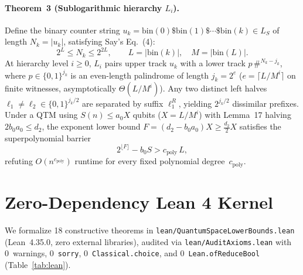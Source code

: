 \documentclass[11pt,twocolumn]{article}
\begin{document}
\paragraph{Theorem~3 (Sublogarithmic hierarchy $L_i$).}
Define the binary counter string $u_k = \mathrm{bin}(0)\$\mathrm{bin}(1)\$\cdots\$\mathrm{bin}(k) \in L_S$ of length $N_k = |u_k|$, satisfying Say's Eq.~(4):
\begin{equation}
  2^L \le N_k \le 2^{2L}, \qquad L = |\mathrm{bin}(k)|, \quad M = |\mathrm{bin}(L)|.
  \label{eq:eq4}
\end{equation}
At hierarchy level $i \ge 0$, $L_i$ pairs upper track $u_k$ with a lower track $p\,\#^{N_k - j_k}$, where $p \in \{0,1\}^{j_k}$ is an even-length palindrome of length $j_k = 2^e$ ($e = \lceil L / M^i \rceil$ on finite witnesses, asymptotically $\Theta(L / M^i)$). Any two distinct left halves $\ell_1 \neq \ell_2 \in \{0,1\}^{j_k/2}$ are separated by suffix $\ell_1^R$, yielding $2^{j_k/2}$ dissimilar prefixes. Under a QTM using $S(n) \le a_0 X$ qubits ($X = L/M^i$) with Lemma~17 halving $2 b_0 a_0 \le d_2$, the exponent lower bound $F = (d_2 - b_0 a_0)X \ge \frac{d_2}{2} X$ satisfies the superpolynomial barrier
\begin{equation}
  2^{\lfloor F \rfloor} - b_0 S > c_{\mathrm{poly}}\,L,
  \label{eq:barrier}
\end{equation}
refuting $O(n^{c_{\mathrm{poly}}})$ runtime for every fixed polynomial degree~$c_{\mathrm{poly}}$.

\section{Zero-Dependency Lean 4 Kernel}\label{sec:lean}
We formalize 18 constructive theorems in \texttt{lean/QuantumSpaceLowerBounds.lean} (Lean~4.35.0, zero external libraries), audited via \texttt{lean/AuditAxioms.lean} with 0~warnings, 0~\texttt{sorry}, 0~\texttt{Classical.choice}, and 0~\texttt{Lean.ofReduceBool} (Table~\ref{tab:lean}).
\end{document}
